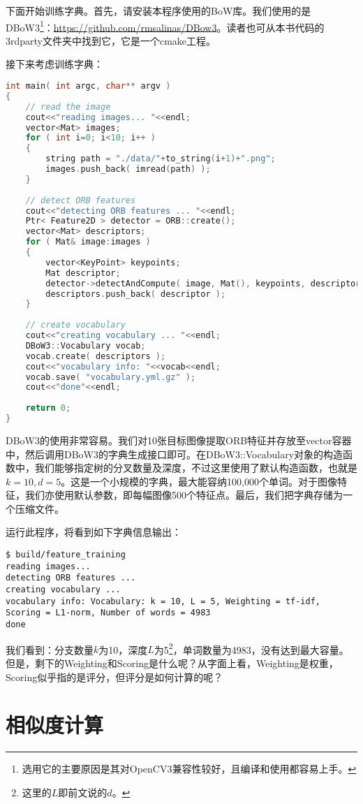 下面开始训练字典。首先，请安装本程序使用的BoW库。我们使用的是DBoW3\footnote{选用它的主要原因是其对OpenCV3兼容性较好，且编译和使用都容易上手。}：\url{https://github.com/rmsalinas/DBow3}。读者也可从本书代码的3rdparty文件夹中找到它，它是一个cmake工程。

接下来考虑训练字典：

\begin{lstlisting}[language=c++,caption=slambook/ch12/feature\_training.cpp]
int main( int argc, char** argv )
{
	// read the image 
	cout<<"reading images... "<<endl;
	vector<Mat> images; 
	for ( int i=0; i<10; i++ )
	{
		string path = "./data/"+to_string(i+1)+".png";
		images.push_back( imread(path) );
	} 
	
	// detect ORB features
	cout<<"detecting ORB features ... "<<endl;
	Ptr< Feature2D > detector = ORB::create();
	vector<Mat> descriptors;
	for ( Mat& image:images )
	{
		vector<KeyPoint> keypoints; 
		Mat descriptor;
		detector->detectAndCompute( image, Mat(), keypoints, descriptor );
		descriptors.push_back( descriptor );
	}
	
	// create vocabulary 
	cout<<"creating vocabulary ... "<<endl;
	DBoW3::Vocabulary vocab;
	vocab.create( descriptors );
	cout<<"vocabulary info: "<<vocab<<endl;
	vocab.save( "vocabulary.yml.gz" );
	cout<<"done"<<endl;
	
	return 0;
}
\end{lstlisting}

DBoW3的使用非常容易。我们对10张目标图像提取ORB特征并存放至vector容器中，然后调用DBoW3的字典生成接口即可。在DBoW3::Vocabulary对象的构造函数中，我们能够指定树的分叉数量及深度，不过这里使用了默认构造函数，也就是$k=10,d=5$。这是一个小规模的字典，最大能容纳100,000个单词。对于图像特征，我们亦使用默认参数，即每幅图像500个特征点。最后，我们把字典存储为一个压缩文件。

运行此程序，将看到如下字典信息输出：

\begin{lstlisting}
$ build/feature_training
reading images...
detecting ORB features ...
creating vocabulary ...
vocabulary info: Vocabulary: k = 10, L = 5, Weighting = tf-idf, Scoring = L1-norm, Number of words = 4983
done
\end{lstlisting}

我们看到：分支数量$k$为10，深度$L$为5\footnote{这里的$L$即前文说的$d$。}，单词数量为4983，没有达到最大容量。但是，剩下的Weighting和Scoring是什么呢？从字面上看，Weighting是权重，Scoring似乎指的是评分，但评分是如何计算的呢？

\section{相似度计算}
